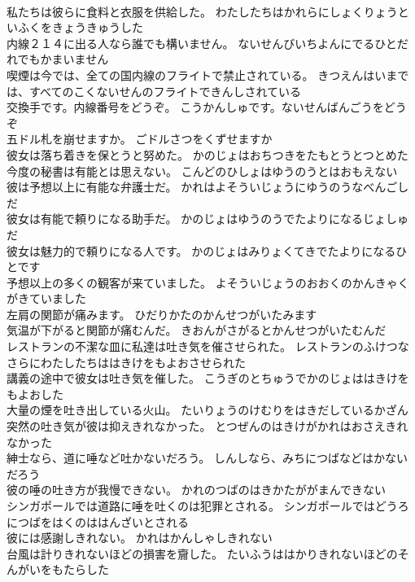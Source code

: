 \documentclass[8pt]{extreport}
\begin{document}
\begin{CJK}{UTF8}{min}
\\	私たちは彼らに食料と衣服を供給した。	わたしたちはかれらにしょくりょうといふくをきょうきゅうした 
\\	内線２１４に出る人なら誰でも構いません。	ないせんびいちよんにでるひとだれでもかまいません 
\\	喫煙は今では、全ての国内線のフライトで禁止されている。	きつえんはいまでは、すべてのこくないせんのフライトできんしされている 
\\	交換手です。内線番号をどうぞ。	こうかんしゅです。ないせんばんごうをどうぞ 
\\	五ドル札を崩せますか。	ごドルさつをくずせますか 
\\	彼女は落ち着きを保とうと努めた。	かのじょはおちつきをたもとうとつとめた 
\\	今度の秘書は有能とは思えない。	こんどのひしょはゆうのうとはおもえない 
\\	彼は予想以上に有能な弁護士だ。	かれはよそういじょうにゆうのうなべんごしだ 
\\	彼女は有能で頼りになる助手だ。	かのじょはゆうのうでたよりになるじょしゅだ 
\\	彼女は魅力的で頼りになる人です。	かのじょはみりょくてきでたよりになるひとです 
\\	予想以上の多くの観客が来ていました。	よそういじょうのおおくのかんきゃくがきていました 
\\	左肩の関節が痛みます。	ひだりかたのかんせつがいたみます 
\\	気温が下がると関節が痛むんだ。	きおんがさがるとかんせつがいたむんだ 
\\	レストランの不潔な皿に私達は吐き気を催させられた。	レストランのふけつなさらにわたしたちははきけをもよおさせられた 
\\	講義の途中で彼女は吐き気を催した。	こうぎのとちゅうでかのじょははきけをもよおした 
\\	大量の煙を吐き出している火山。	たいりょうのけむりをはきだしているかざん 
\\	突然の吐き気が彼は抑えきれなかった。	とつぜんのはきけがかれはおさえきれなかった 
\\	紳士なら、道に唾など吐かないだろう。	しんしなら、みちにつばなどはかないだろう 
\\	彼の唾の吐き方が我慢できない。	かれのつばのはきかたががまんできない 
\\	シンガポールでは道路に唾を吐くのは犯罪とされる。	シンガポールではどうろにつばをはくのははんざいとされる 
\\	彼には感謝しきれない。	かれはかんしゃしきれない 
\\	台風は計りきれないほどの損害を齎した。	たいふうははかりきれないほどのそんがいをもたらした

\end{CJK}
\end{document}
